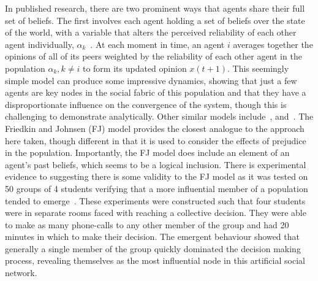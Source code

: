 In published research, there are two prominent ways that agents share their full set of beliefs. The first involves each agent holding a set of beliefs over the state of the world, with a variable that alters the perceived reliability of each other agent individually, $\alpha_k$~\cite{Hegselmann2002Opinion}. At each moment in time, an agent $i$ averages together the opinions of all of its peers weighted by the reliability of each other agent in the population $\alpha_{k}, k \neq i$  to form its updated opinion $x(t+1)$. This seemingly simple model can produce some impressive dynamics, showing that just a few agents are key nodes in the social fabric of this population and that they have a disproportionate influence on the convergence of the system, though this is challenging to demonstrate analytically. Other similar models include~\cite{Deffuant2000MixingAgents}, \cite{Proskurnikov2017OpinionAgents} and~\cite{Friedkin1999SocialChange}. The Friedkin and Johnsen (FJ) model provides the closest analogue to the approach here taken, though different in that it is used to consider the effects of prejudice in the population. Importantly, the FJ model does include an element of an agent's past beliefs, which seems to be a logical inclusion. There is experimental evidence to suggesting there is some validity to the FJ model as it was tested on 50 groups of 4 students verifying that a more influential member of a population tended to emerge~\cite{Friedkin2011APower}. These experiments were constructed such that four students were in separate rooms faced with reaching a collective decision. They were able to make as many phone-calls to any other member of the group and had 20 minutes in which to make their decision. The emergent behaviour showed that generally a single member of the group quickly dominated the decision making process, revealing themselves as the most influential node in this artificial social network. 

